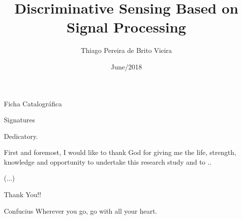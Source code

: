 \documentclass[en, oneside, onehalfspacing]{risethesis}
\title{Discriminative Sensing Based on Signal Processing}
\date{June/2018}
\author{Thiago Pereira de Brito Vieira}
\begin{document}
\frontmatter
\frontpage
\presentationpage

\begin{dedicatory}Ficha Catalográfica\end{dedicatory}

\begin{dedicatory}Signatures\end{dedicatory}

\begin{dedicatory}Dedicatory.\end{dedicatory}

\agradecimentos
First and foremost, I would like to thank God for giving me the life, strength, knowledge and opportunity to undertake this research study and to ..

(...)

Thank You!!

\begin{epigraph}[]{Confucius}
	Wherever you go, go with all your heart.
\end{epigraph}

\resumo


\abstract


\tableofcontents

\makeatletter
\renewcommand{\@thesubfigure}{\thesubfigure:\hskip\subfiglabelskip}
\makeatother
\setcounter{lofdepth}{2}

\listoffigures
\listoftables


\mainmatter











\clearpage
\addappheadtotoc
\end{document}
